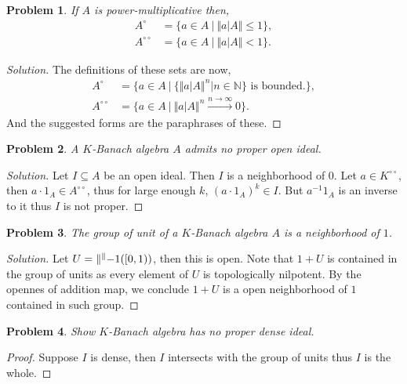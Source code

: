 \documentclass[8pt]{article}
\numberwithin{equation}{section}
\newenvironment{solution}{\begin{proof}[Solution]}{\end{proof}}
\newtheorem{problem}{Problem}[section]
\newcommand{\norm}[1]{\Vert #1 \Vert}
\newcommand{\N}[0]{\mathbb{N}}
\newcommand{\sep}[0]{\:|\:}
\newcommand{\dcirc}[0]{{\circ\circ}}
\begin{document}
\begin{problem}
  If $A$ is power-multiplicative then,
  \begin{align*}
    A^\circ & = \{a\in A\sep \norm{a|A}\leq 1\},\\
    A^\dcirc & = \{a\in A\sep \norm{a|A}<1\}.
  \end{align*}
\end{problem}
\begin{solution}
  The definitions of these sets are now,
  \begin{align*}
    A^\circ & = \{a\in A\sep \{\norm{a|A}^n|n\in\N\}\text{ is bounded.}\},\\
    A^\dcirc & = \{a\in A\sep \norm{a|A}^n\stackrel{n\to\infty}{\to}0\}.
  \end{align*}
  And the suggested forms are the paraphrases of these.
\end{solution}
\begin{problem}
  A $K$-Banach algebra $A$ admits no proper open ideal.
\end{problem}
\begin{solution}
  Let $I\subseteq A$ be an open ideal. Then $I$ is a neighborhood of $0$. Let $a\in K^\dcirc$, then $a\cdot 1_A\in A^\dcirc$, thus for large enough $k$, $(a\cdot 1_A)^k\in I$. But $a^{-1}1_A$ is an inverse to it thus $I$ is not proper. 
\end{solution}
\begin{problem}
  The group of unit of a $K$-Banach algebra $A$ is a neighborhood of $1$.
\end{problem}
\begin{solution}
  Let $U = \norm^{-1}([0,1))$, then this is open. Note that $1+U$ is contained in the group of units as every element of $U$ is topologically nilpotent. By the opennes of addition map, we conclude $1+U$ is a open neighborhood of $1$ contained in such group.
\end{solution}
\begin{problem}
  Show $K$-Banach algebra has no proper dense ideal.
\end{problem}
\begin{proof}
  Suppose $I$ is dense, then $I$ intersects with the group of units thus $I$ is the whole.
\end{proof}
\end{document}
